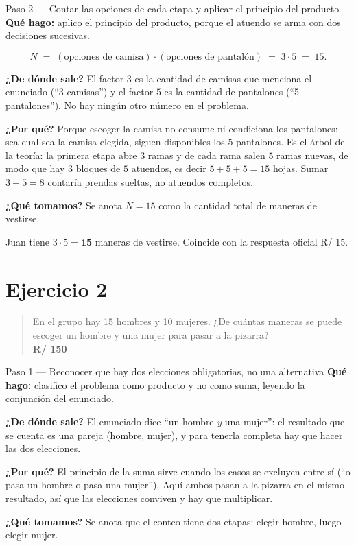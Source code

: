 \documentclass[11pt]{article}
\begin{document}
\begin{paso}{Paso 2 --- Contar las opciones de cada etapa y aplicar el principio del producto}
\textbf{Qué hago:} aplico el principio del producto, porque el atuendo se arma con dos decisiones sucesivas.

\[
  N \;=\; (\text{opciones de camisa})\cdot(\text{opciones de pantalón}) \;=\; 3\cdot 5 \;=\; 15 .
\]

\textbf{¿De dónde sale?} El factor $3$ es la cantidad de camisas que menciona el enunciado (``3 camisas'') y el factor $5$ es la cantidad de pantalones (``5 pantalones''). No hay ningún otro número en el problema.

\textbf{¿Por qué?} Porque escoger la camisa no consume ni condiciona los pantalones: sea cual sea la camisa elegida, siguen disponibles los $5$ pantalones. Es el árbol de la teoría: la primera etapa abre $3$ ramas y de cada rama salen $5$ ramas nuevas, de modo que hay $3$ bloques de $5$ atuendos, es decir $5+5+5=15$ hojas. Sumar $3+5=8$ contaría prendas sueltas, no atuendos completos.

\textbf{¿Qué tomamos?} Se anota $N=15$ como la cantidad total de maneras de vestirse.
\end{paso}

\begin{resp}
Juan tiene $3\cdot 5=\mathbf{15}$ maneras de vestirse. Coincide con la respuesta oficial R/ 15.
\end{resp}

\section*{Ejercicio 2}

\begin{quote}
En el grupo hay 15 hombres y 10 mujeres. ¿De cuántas maneras se puede escoger un hombre y una mujer para pasar a la pizarra?\\[2pt]
\textbf{R/ 150}
\end{quote}

\begin{paso}{Paso 1 --- Reconocer que hay dos elecciones obligatorias, no una alternativa}
\textbf{Qué hago:} clasifico el problema como producto y no como suma, leyendo la conjunción del enunciado.

\textbf{¿De dónde sale?} El enunciado dice ``un hombre \emph{y} una mujer'': el resultado que se cuenta es una pareja (hombre, mujer), y para tenerla completa hay que hacer las dos elecciones.

\textbf{¿Por qué?} El principio de la suma sirve cuando los casos se excluyen entre sí (``o pasa un hombre o pasa una mujer''). Aquí ambos pasan a la pizarra en el mismo resultado, así que las elecciones conviven y hay que multiplicar.

\textbf{¿Qué tomamos?} Se anota que el conteo tiene dos etapas: elegir hombre, luego elegir mujer.
\end{paso}
\end{document}
